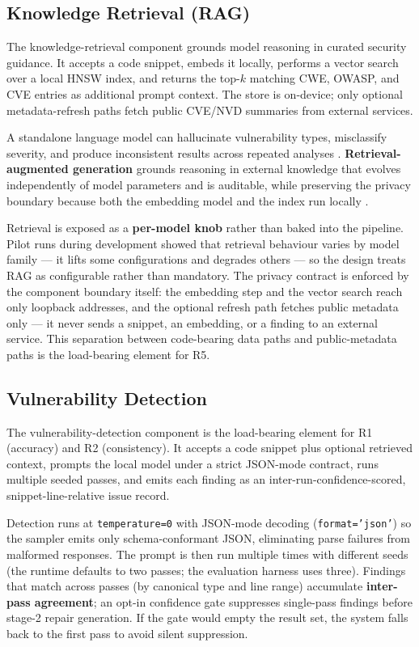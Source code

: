 \subsection{Knowledge Retrieval (RAG)}
\label{subsec:knowledge-retrieval}

The knowledge-retrieval component grounds model reasoning in curated security guidance. It accepts a code snippet, embeds it locally, performs a vector search over a local HNSW index, and returns the top-$k$ matching CWE, OWASP, and CVE entries as additional prompt context. The store is on-device; only optional metadata-refresh paths fetch public CVE/NVD summaries from external services.

A standalone language model can hallucinate vulnerability types, misclassify severity, and produce inconsistent results across repeated analyses \cite{ji2023hallucination}. \textbf{Retrieval-augmented generation} grounds reasoning in external knowledge that evolves independently of model parameters and is auditable, while preserving the privacy boundary because both the embedding model and the index run locally \cite{lewis2020rag,karpukhin2020dpr}.

Retrieval is exposed as a \textbf{per-model knob} rather than baked into the pipeline. Pilot runs during development showed that retrieval behaviour varies by model family --- it lifts some configurations and degrades others --- so the design treats RAG as configurable rather than mandatory. The privacy contract is enforced by the component boundary itself: the embedding step and the vector search reach only loopback addresses, and the optional refresh path fetches public metadata only --- it never sends a snippet, an embedding, or a finding to an external service. This separation between code-bearing data paths and public-metadata paths is the load-bearing element for R5.

\subsection{Vulnerability Detection}
\label{subsec:vulnerability-detection}

The vulnerability-detection component is the load-bearing element for R1 (accuracy) and R2 (consistency). It accepts a code snippet plus optional retrieved context, prompts the local model under a strict JSON-mode contract, runs multiple seeded passes, and emits each finding as an inter-run-confidence-scored, snippet-line-relative issue record.

Detection runs at \texttt{temperature=0} with JSON-mode decoding (\texttt{format='json'}) so the sampler emits only schema-conformant JSON, eliminating parse failures from malformed responses. The prompt is then run multiple times with different seeds (the runtime defaults to two passes; the evaluation harness uses three). Findings that match across passes (by canonical type and line range) accumulate \textbf{inter-pass agreement}; an opt-in confidence gate suppresses single-pass findings before stage-2 repair generation. If the gate would empty the result set, the system falls back to the first pass to avoid silent suppression.

